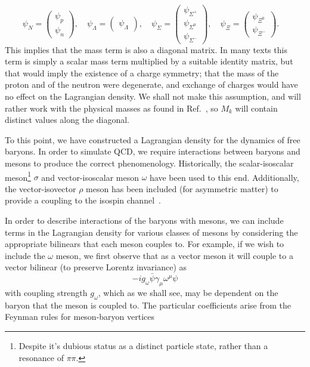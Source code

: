 \documentclass[11pt,a4paper,twoside]{carrollthesis}
\newcommand{\be}{\begin{equation}}
\newcommand{\ee}{\end{equation}}
\newcommand{\s}{\sigma}
\newcommand{\w}{\omega}
\begin{document}
%
\be \label{eq:isospingroups} \psi_N = \begin{pmatrix}\psi_p\\\psi_n\end{pmatrix}, \quad
  \psi_\Lambda = \begin{pmatrix}\psi_\Lambda\end{pmatrix}, \quad
    \psi_\Sigma
    = \begin{pmatrix}\psi_{\Sigma^+}\\\psi_{\Sigma^0}\\\psi_{\Sigma^-}\end{pmatrix},
    \quad \psi_\Xi
    = \begin{pmatrix}\psi_{\Xi^0}\\\psi_{\Xi^-}\end{pmatrix}. \quad
    \ee
%
This implies that the mass term is also a diagonal matrix. In many
texts this term is simply a scalar mass term multiplied by a suitable
identity matrix, but that would imply the existence of a charge
symmetry; that the mass of the proton and of the neutron were
degenerate, and exchange of charges would have no effect on the
Lagrangian density. We shall not make this assumption, and will rather
work with the physical masses as found in Ref.~\cite{Amsler:2008zzb},
so $M_k$ will contain distinct values along the diagonal.\par
%
To this point, we have constructed a Lagrangian density for the
dynamics of free baryons. In order to simulate QCD, we require
interactions between baryons and mesons to produce the correct
phenomenology.  Historically, the scalar-isoscalar
meson\footnote{Despite it's dubious status as a distinct particle
  state, rather than a resonance of $\pi\pi$.} $\s$ and
vector-isoscalar meson $\w$ have been used to this end. Additionally,
the vector-isovector $\rho$ meson has been included (for asymmetric
matter) to provide a coupling to the isospin
channel~\cite{Serot:1984ey}.\par
%
In order to describe interactions of the baryons with mesons, we can
include terms in the Lagrangian density for various classes of mesons
by considering the appropriate bilinears that each meson couples
to. For example, if we wish to include the $\w$ meson, we first
observe that as a vector meson it will couple to a vector bilinear (to
preserve Lorentz invariance) as
%
\be -ig_{\w}\bar{\psi}\gamma_\mu\w^\mu\psi \ee
%
with coupling strength $g_\w$, which as we shall see, may be dependent
on the baryon that the meson is coupled to. The particular
coefficients arise from the Feynman rules for meson-baryon vertices
\end{document}

